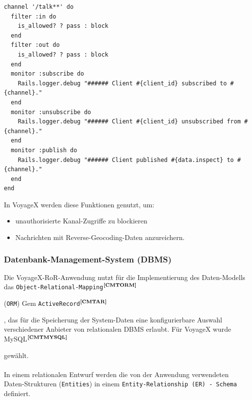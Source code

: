 \lstset{language=CoffeeScript}
\begin{lstlisting}[frame=single,xleftmargin=0pt,numbers=none]
channel '/talk**' do
  filter :in do
  	is_allowed? ? pass : block
  end
  filter :out do
  	is_allowed? ? pass : block
  end
  monitor :subscribe do
    Rails.logger.debug "###### Client #{client_id} subscribed to #{channel}."
  end
  monitor :unsubscribe do
    Rails.logger.debug "###### Client #{client_id} unsubscribed from #{channel}."
  end
  monitor :publish do
    Rails.logger.debug "###### Client published #{data.inspect} to #{channel}."
  end
end
\end{lstlisting}
In VoyageX werden diese Funktionen genutzt, um:
\begin{itemize}[leftmargin=*,noitemsep,topsep=1ex,parsep=0pt,partopsep=0pt]
\item unauthorisierte Kanal-Zugriffe zu blockieren
\item Nachrichten mit Reverse-Geocoding-Daten anzureichern.
\end{itemize}

\subsubsection{Datenbank-Management-System (DBMS)}\label{DBMS}
Die VoyageX-RoR-Anwendung nutzt für die Implementierung des Daten-Modells das \texttt{Object-Relational-Mapping}$^{\textbf{\ref{CMTORM}}}$%
\addtocounter{footnote}{1}%
(\texttt{ORM}) Gem \texttt{ActiveRecord}$^{\textbf{\ref{CMTAR}}}$%
\addtocounter{footnote}{1}%
, das für die Speicherung der System-Daten eine konfigurierbare Auswahl verschiedener Anbieter von relationalen DBMS erlaubt. Für VoyageX wurde MySQL$^{\textbf{\ref{CMTMYSQL}}}$%
\addtocounter{footnote}{1}%
 gewählt.\\ \\
In einem relationalen Entwurf werden die von der Anwendung verwendeten Daten-Strukturen (\texttt{Entities}) in einem \texttt{Entity-Relationship (ER) - Schema} definiert.
